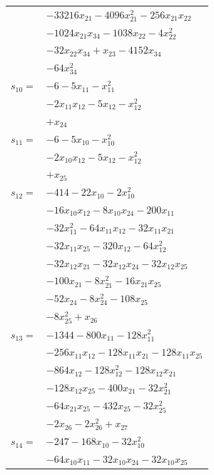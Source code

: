 \begin{longtable}{@{}r@{\;}l@{}}
 & \(\displaystyle -33216x_{21} -4096x_{21}^{2} -256x_{21}x_{22}\) \\
 & \(\displaystyle -1024x_{21}x_{34} -1038x_{22} -4x_{22}^{2}\) \\
 & \(\displaystyle -32x_{22}x_{34} +x_{23} -4152x_{34}\) \\
 & \(\displaystyle -64x_{34}^{2}\) \\[3pt]
\(s_{10}=\) & \(\displaystyle -6 -5x_{11} -x_{11}^{2}\) \\
 & \(\displaystyle -2x_{11}x_{12} -5x_{12} -x_{12}^{2}\) \\
 & \(\displaystyle +x_{24}\) \\[3pt]
\(s_{11}=\) & \(\displaystyle -6 -5x_{10} -x_{10}^{2}\) \\
 & \(\displaystyle -2x_{10}x_{12} -5x_{12} -x_{12}^{2}\) \\
 & \(\displaystyle +x_{25}\) \\[3pt]
\(s_{12}=\) & \(\displaystyle -414 -22x_{10} -2x_{10}^{2}\) \\
 & \(\displaystyle -16x_{10}x_{12} -8x_{10}x_{24} -200x_{11}\) \\
 & \(\displaystyle -32x_{11}^{2} -64x_{11}x_{12} -32x_{11}x_{21}\) \\
 & \(\displaystyle -32x_{11}x_{25} -320x_{12} -64x_{12}^{2}\) \\
 & \(\displaystyle -32x_{12}x_{21} -32x_{12}x_{24} -32x_{12}x_{25}\) \\
 & \(\displaystyle -100x_{21} -8x_{21}^{2} -16x_{21}x_{25}\) \\
 & \(\displaystyle -52x_{24} -8x_{24}^{2} -108x_{25}\) \\
 & \(\displaystyle -8x_{25}^{2} +x_{26}\) \\[3pt]
\(s_{13}=\) & \(\displaystyle -1344 -800x_{11} -128x_{11}^{2}\) \\
 & \(\displaystyle -256x_{11}x_{12} -128x_{11}x_{21} -128x_{11}x_{25}\) \\
 & \(\displaystyle -864x_{12} -128x_{12}^{2} -128x_{12}x_{21}\) \\
 & \(\displaystyle -128x_{12}x_{25} -400x_{21} -32x_{21}^{2}\) \\
 & \(\displaystyle -64x_{21}x_{25} -432x_{25} -32x_{25}^{2}\) \\
 & \(\displaystyle -2x_{26} -2x_{26}^{2} +x_{27}\) \\[3pt]
\(s_{14}=\) & \(\displaystyle -247 -168x_{10} -32x_{10}^{2}\) \\
 & \(\displaystyle -64x_{10}x_{11} -32x_{10}x_{24} -32x_{10}x_{25}\) \\

\end{longtable}
